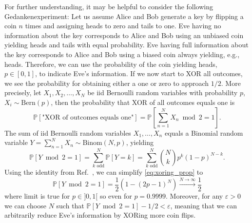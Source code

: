 For further understanding, it may be helpful to consider the following Gedankenexperiment:
Let us assume Alice and Bob generate a key by flipping a coin $n$ times and assigning heads to zero and tails to one.
Eve having no information about the key corresponds to Alice and Bob using an unbiased coin yielding heads and tails with equal probability.
Eve having full information about the key corresponds to Alice and Bob using a biased coin always yielding, e.g., heads.
Therefore, we can use the probability of the coin yielding heads, $p\in[0,1]$, to indicate Eve's information.
If we now start to XOR all outcomes, we see the probability for obtaining either a one or zero to approach $1/2$.
More precisely, let $X_1,X_2,\dots,X_N$ be \gls{iid} Bernoulli random variables with probability $p$, $X_i\sim\text{Bern}(p)$, then the probability that XOR of all outcomes equals one is
\begin{equation}
	\mathbb{P}\left[
		\text{"XOR of outcomes equals one"}
	\right]
	=
	\mathbb{P}\left[
		\sum_{n=1}^NX_n\bmod2
		=
		1
	\right]
	.
\end{equation}
The sum of \gls{iid} Bernoulli random variables $X_1,\dots,X_n$ equals a Binomial random variable $Y=\sum_{n=1}^NX_n\sim\text{Binom}(N,p)$, yielding
\begin{equation}
	\mathbb{P}\left[
		Y\bmod2
		=
		1
	\right]
	=
	\sum^N_{k\text{ odd}}
	\mathbb{P}\left[Y=k\right]
	=
	\sum^N_{k\text{ odd}}
	\binom{N}{k}
	p^k(1-p)^{N-k}
	\label{eq:xoring_prop}
	.
\end{equation}
Using the identity from Ref.~\cite{stackexchange2528974}, we can simplify \cref{eq:xoring_prop} to
\begin{equation}
	\mathbb{P}\left[
		Y\bmod2
		=
		1
	\right]
	=
	\frac{1}{2}
	\left(
		1-(2p-1)^N
	\right)
	\xrightarrow{N\to\infty}
	\frac{1}{2}
\end{equation}
where limit is true for $p\in]0,1[$ so even for $p=0.9999$.
Moreover, for any $\varepsilon>0$ we can choose $N$ such that $\mathbb{P}\left[Y\bmod2=1\right]-1/2<\varepsilon$, meaning that we can arbitrarily reduce Eve's information by XORing more coin flips.

